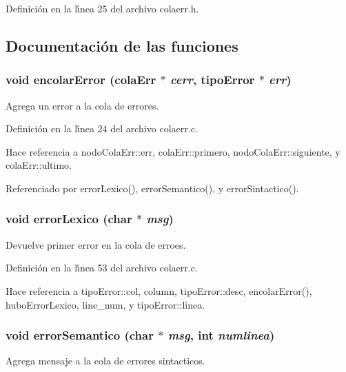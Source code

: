 Definici\'{o}n en la l\'{\i}nea 25 del archivo colaerr.h.

\subsection{Documentaci\'{o}n de las funciones}
\subsubsection{\setlength{\rightskip}{0pt plus 5cm}void encolar\-Error ({\bf cola\-Err} $\ast$ {\em cerr}, {\bf tipo\-Error} $\ast$ {\em err})}\label{colaerr_8h_a5}


Agrega un error a la cola de errores. 



Definici\'{o}n en la l\'{\i}nea 24 del archivo colaerr.c.

Hace referencia a nodo\-Cola\-Err::err, cola\-Err::primero, nodo\-Cola\-Err::siguiente, y cola\-Err::ultimo.

Referenciado por error\-Lexico(), error\-Semantico(), y error\-Sintactico().
\subsubsection{\setlength{\rightskip}{0pt plus 5cm}void error\-Lexico (char $\ast$ {\em msg})}\label{colaerr_8h_a7}


Devuelve primer error en la cola de erroes. 



Definici\'{o}n en la l\'{\i}nea 53 del archivo colaerr.c.

Hace referencia a tipo\-Error::col, column, tipo\-Error::desc, encolar\-Error(), hubo\-Error\-Lexico, line\_\-num, y tipo\-Error::linea.
\subsubsection{\setlength{\rightskip}{0pt plus 5cm}void error\-Semantico (char $\ast$ {\em msg}, int {\em numlinea})}\label{colaerr_8h_a9}


Agrega mensaje a la cola de errores sintacticos. 



